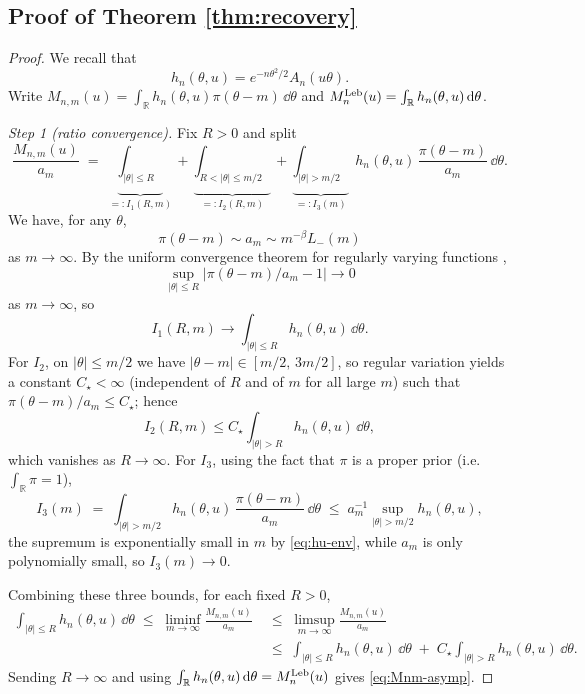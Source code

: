\subsection{Proof of Theorem \ref{thm:recovery}}



\begin{proof}
We recall that
$$
h_{n}(\theta,u)=e^{-n\theta^2/2 }A_n(u \theta ).
$$
Write $M_{n,m}(u)=\int_{\mathbb R} h_n(\theta,u)\pi(\theta-m)\,\dd\theta$ and $M_n^{\mathrm{Leb}}(u)=\int_{\mathbb R} h_n(\theta,u)\,\mathrm{d}\theta$.

\emph{Step 1 (ratio convergence).}  Fix $R>0$ and split
\[
  \frac{M_{n,m}(u)}{a_m}
  \;=\;\underbrace{\int_{|\theta|\leq R}}_{=:I_1(R,m)}
   +\underbrace{\int_{R<|\theta|\leq m/2}}_{=:I_2(R,m)}
   +\underbrace{\int_{|\theta|>m/2}}_{=:I_3(m)}\;
   h_{n}(\theta,u)\,\frac{\pi(\theta-m)}{a_m}\,\dd\theta.
\]
We have, for any $\theta$,
$$
\pi(\theta-m)\sim a_m \sim m^{-\beta}L_-(m)
$$
as $m\to\infty$. By the uniform convergence theorem for regularly varying functions
\citep[Theorem~1.2.1]{Bingham1987},
$$
\sup_{|\theta|\leq R}|\pi(\theta-m)/a_m-1|\to 0
$$
as $m\to\infty$, so
$$
I_1(R,m)\to\int_{|\theta|\leq R}h_{n}(\theta,u)\,\dd\theta.
$$
For $I_2$, on $|\theta|\leq m/2$ we have $|\theta-m|\in[m/2,\,3m/2]$, so
regular variation yields a constant $C_\star<\infty$ (independent of $R$ and of
$m$ for all large $m$) such that $\pi(\theta-m)/a_m\leq C_\star$; hence
$$
I_2(R,m)\leq C_\star\int_{|\theta|>R}h_{n}(\theta,u)\,\dd\theta,
$$ which vanishes
as $R\to\infty$. For $I_3$, using the fact that $\pi$ is a proper prior
(i.e.\ $\int_\mathbb{R}\pi=1$),
\[
I_3(m)\;=\;\int_{|\theta|>m/2}h_{n}(\theta,u)\,\frac{\pi(\theta-m)}{a_m}\,\dd\theta
   \;\leq\; a_m^{-1}\sup_{|\theta|>m/2}h_{n}(\theta,u),
\]
the supremum is exponentially small in $m$ by \eqref{eq:hu-env}, while $a_m$ is
only polynomially small, so $I_3(m)\to 0$.

Combining these three bounds, for each fixed $R>0$,
\begin{align*}
   \int_{|\theta|\leq R}h_{n}(\theta,u)\,\dd\theta
   \;\leq\; \liminf_{m\to\infty}\frac{M_{n,m}(u)}{a_m}
   &\;\leq\; \limsup_{m\to\infty}\frac{M_{n,m}(u)}{a_m}\\
   & \;\leq\; \int_{|\theta|\leq R}h_{n}(\theta,u)\,\dd\theta
   \;+\; C_\star\!\int_{|\theta|>R}h_{n}(\theta,u)\,\dd\theta.
\end{align*}
Sending $R\to\infty$ and using $\int_\mathbb{R} h_{n}(\theta,u)\,\mathrm{d}\theta
= M_n^{\mathrm{Leb}}(u)$ gives \eqref{eq:Mnm-asymp}.


\end{proof}
